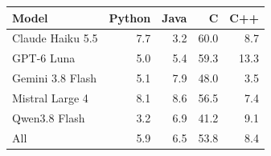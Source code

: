 \begin{tabular}{@{}lrrrr@{}}
\toprule
Model & Python & Java & C & C++ \\
\midrule
Claude Haiku 5.5 & 7.7 & 3.2 & 60.0 & 8.7 \\
GPT-6 Luna & 5.0 & 5.4 & 59.3 & 13.3 \\
Gemini 3.8 Flash & 5.1 & 7.9 & 48.0 & 3.5 \\
Mistral Large 4 & 8.1 & 8.6 & 56.5 & 7.4 \\
Qwen3.8 Flash & 3.2 & 6.9 & 41.2 & 9.1 \\
\midrule
All & 5.9 & 6.5 & 53.8 & 8.4 \\
\bottomrule
\end{tabular}
